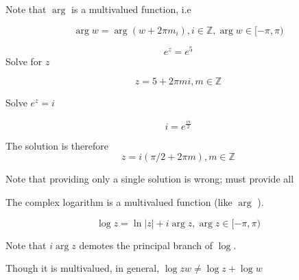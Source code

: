 \documentclass[../notes.tex]{subfiles}
\begin{document}
Note that $ \arg $ is a multivalued function, i.e

\begin{equation}
	\arg w = \arg (w + 2 \pi m_i), i \in \mathbb{Z}, \arg w \in [-\pi, \pi)
\end{equation}
	

\begin{example}
	\begin{equation}
		e^z = e^5
	\end{equation}
	Solve for $ z $ 

	\begin{equation}
		z = 5 + 2 \pi m i, m \in \mathbb{Z}
	\end{equation}
\end{example}

\begin{example}
	Solve $ e^z = i $ 

	\begin{equation}
		i = e^{\frac{i\pi}{2}}
	\end{equation}

	

	The solution is therefore 
	\begin{equation}
		z = i(\pi/2 + 2\pi m), m \in \mathbb{Z}
	\end{equation}

	Note that providing only a single solution is wrong; must provide all
\end{example}


The complex logarithm is a multivalued function (like $ \arg $ ).


\begin{equation}
	\log z = \ln |z| + i \arg z, \arg z \in [-\pi, \pi)
\end{equation}

Note that $ i \arg z $ demotes the principal branch of $ \log $.


Though it is multivalued, in general, $ \log zw \neq  \log z + \log w $ 
\end{document}
